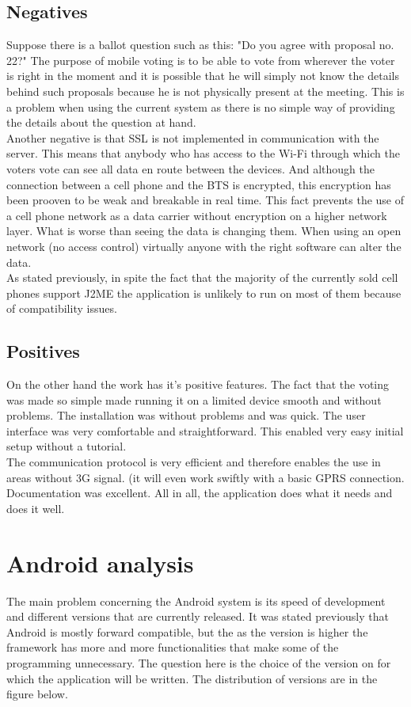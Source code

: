\documentclass[11pt,twoside,a4paper]{book}
\begin{document}
\subsection{Negatives}
Suppose there is a ballot question such as this: "Do you agree with proposal no. 22?" The purpose of mobile voting is to be able to vote from wherever the voter is right in the moment and it is possible that he will simply not know the details behind such proposals because he is not physically present at the meeting. This is a problem when using the current system as there is no simple way of providing the details about the question at hand.\\
Another negative is that SSL is not implemented in communication with the server. This means that anybody who has access to the Wi-Fi through which the voters vote can see all data en route between the devices. And although the connection between a cell phone and the BTS\cite{whatISBTS}  is encrypted, this encryption has been prooven to be weak\cite{GSMCypherWeakness} and breakable in real time. This fact  prevents the use of a cell phone network as a data carrier without encryption on a higher network layer. What is worse than seeing the data is changing them. When using an open network (no access control) virtually anyone with the right software can alter the data.\\
As stated previously, in spite the fact that the majority of the currently sold cell phones support J2ME the application is unlikely to run on most of them because of compatibility issues.\cite{bakalarkaJV}

\subsection{Positives}
On the other hand the work has it's positive features. The fact that the voting was made so simple made running it on a limited device smooth and without problems. The installation was without problems and was quick. The user interface was very comfortable and straightforward. This enabled very easy initial setup without a tutorial.\\
The communication protocol is very efficient and therefore enables the use in areas without 3G signal. (it will even work swiftly with a basic GPRS connection. Documentation was excellent. All in all, the application does what it needs and does it well.

\section{Android analysis}
The main problem concerning the Android system is its speed of development and different versions that are currently released. It was stated previously that Android is mostly forward compatible, but the as the version is higher the framework has more and more functionalities that make some of the programming unnecessary. The question here is the choice of the version on for which the application will be written. The distribution of versions are in the figure below.
\end{document}
